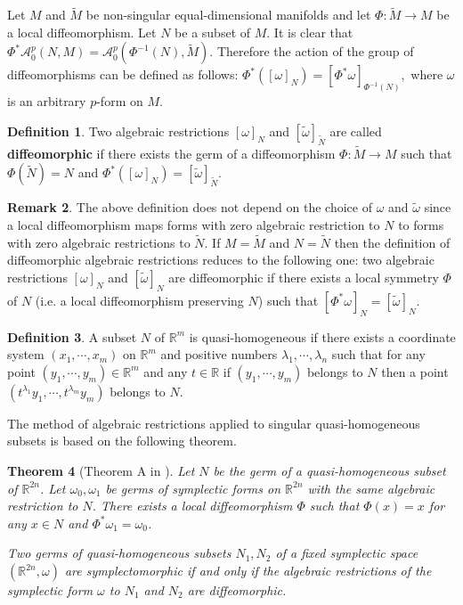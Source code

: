 \documentclass{amsart}
\newtheorem{thm}{Theorem}[section]
\theoremstyle{definition}
\newtheorem{defn}[thm]{Definition}
\newtheorem{rem}[thm]{Remark}
\numberwithin{equation}{section}
\begin{document}
\medskip

Let $M$ and $\widetilde M$ be non-singular equal-dimensional
manifolds and let $\Phi: \widetilde M\to M$ be a local
diffeomorphism. Let $N$ be a subset of $M$. It is clear that $\Phi
^*\mathcal A_0^p(N, M) = \mathcal A_0^p(\Phi ^{-1}(N), \widetilde
M)$. Therefore the action of the group of diffeomorphisms can be
defined as follows: $\Phi ^*([\omega ]_N) = [\Phi ^*\omega ]_{\Phi
^{-1}(N)},$ where $\omega $ is an arbitrary $p$-form on $M$.

\begin{defn}Two algebraic restrictions
$[\omega ]_N$ and $[\widetilde \omega ]_{\widetilde N}$ are called {\bf
diffeomorphic} if there exists the germ of a diffeomorphism $\Phi:
\widetilde M\to M$ such that $\Phi(\widetilde N)=N$ and  $\Phi ^*([\omega ]_N) =[\widetilde \omega ]_{\widetilde N}$.
\end{defn}

\smallskip

\begin{rem}
The above definition does not depend on the choice of $\omega$ and
$\widetilde \omega$ since a local diffeomorphism maps forms with
zero algebraic restriction to $N$ to forms with zero algebraic
restrictions to $\tilde N$. If $M=\widetilde M$ and $N = \widetilde N$ then the definition of
diffeomorphic algebraic restrictions reduces to the following one:
two algebraic restrictions $[\omega ]_N$ and $[\widetilde \omega
]_N$ are diffeomorphic if there exists a local symmetry $\Phi $ of
$N $ (i.e. a local diffeomorphism preserving $N$) such that $[\Phi
^*\omega ]_N = [\widetilde \omega ]_N$.
\end{rem}

\begin{defn}
A subset $N$ of $\mathbb R^m$ is quasi-homogeneous if there exists
a coordinate system $(x_1,\cdots,x_m)$ on $\mathbb R^m$ and
positive numbers $\lambda_1,\cdots,\lambda_n$ such that for any
point $(y_1,\cdots,y_m)\in \mathbb R^m$ and any $t\in \mathbb R$
if $(y_1,\cdots,y_m)$ belongs to $N$ then a point
$(t^{\lambda_1}y_1,\cdots,t^{\lambda_m}y_m)$ belongs to $N$.
\end{defn}
The method of algebraic restrictions applied to singular
quasi-homogeneous subsets is based on the following theorem.

\begin{thm}[Theorem A in \cite{DJZ2}] \label{thm A}
Let $N$ be the germ of a quasi-homogeneous subset of $\mathbb
R^{2n}$. Let $\omega _0, \omega _1$ be germs of symplectic forms
on $\mathbb R^{2n}$ with the same algebraic restriction to $N$.
There exists a local diffeomorphism $\Phi $ such that $\Phi (x) =
x$ for any $x\in N$ and $\Phi ^*\omega _1 = \omega _0$.

Two germs of quasi-homogeneous subsets $N_1, N_2$ of a fixed
symplectic space $(\mathbb R^{2n}, \omega )$ are symplectomorphic
if and only if the algebraic restrictions of the symplectic form
$\omega $ to $N_1$ and $N_2$ are diffeomorphic.

\end{thm}
\end{document}

